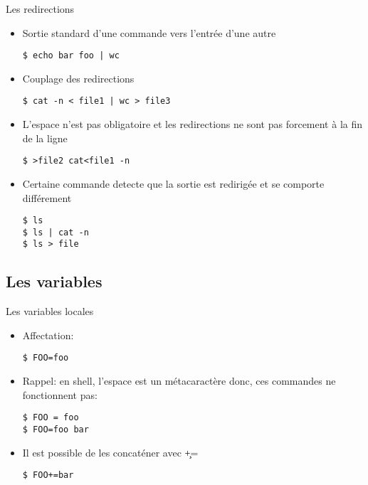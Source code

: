 \begin{frame}[fragile=singleslide]{Les redirections}
  \begin{itemize}
  \item Sortie standard d'une commande vers l'entrée d'une autre
    \begin{lstlisting}
$ echo bar foo | wc
    \end{lstlisting}
  \item Couplage des redirections
    \begin{lstlisting}
$ cat -n < file1 | wc > file3
    \end{lstlisting} %
  \item L'espace n'est pas obligatoire et les redirections ne sont pas
    forcement à la fin de la ligne
    \begin{lstlisting}
$ >file2 cat<file1 -n
    \end{lstlisting} %
  \item Certaine commande detecte que la sortie est redirigée et se
    comporte différement
    \begin{lstlisting}
$ ls
$ ls | cat -n
$ ls > file
    \end{lstlisting}
  \end{itemize}
\end{frame}

\subsection{Les variables}

\begin{frame}[fragile=singleslide]{Les variables locales}
  \begin{itemize}
  \item Affectation:
    \begin{lstlisting}
$ FOO=foo
    \end{lstlisting}
  \item  Rappel: en  shell, l'espace  est un  métacaractère  donc, ces
    commandes ne fonctionnent pas:
    \begin{lstlisting}
$ FOO = foo
$ FOO=foo bar
    \end{lstlisting}
  \item Il est possible de les concaténer avec \c{+=}
    \begin{lstlisting}
$ FOO+=bar
    \end{lstlisting}
  \end{itemize}
\end{frame}

